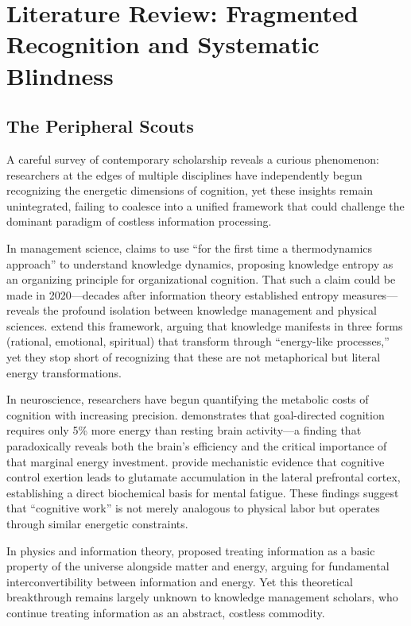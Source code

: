 \section{Literature Review: Fragmented Recognition and Systematic Blindness}

\subsection{The Peripheral Scouts}

A careful survey of contemporary scholarship reveals a curious phenomenon: researchers at the edges of multiple disciplines have independently begun recognizing the energetic dimensions of cognition, yet these insights remain unintegrated, failing to coalesce into a unified framework that could challenge the dominant paradigm of costless information processing.

In management science, \citet{bratianu2020} claims to use ``for the first time a thermodynamics approach'' to understand knowledge dynamics, proposing knowledge entropy as an organizing principle for organizational cognition. That such a claim could be made in 2020---decades after information theory established entropy measures---reveals the profound isolation between knowledge management and physical sciences. \citet{bratianu2020b} extend this framework, arguing that knowledge manifests in three forms (rational, emotional, spiritual) that transform through ``energy-like processes,'' yet they stop short of recognizing that these are not metaphorical but literal energy transformations.

In neuroscience, researchers have begun quantifying the metabolic costs of cognition with increasing precision. \citet{jamadar2025} demonstrates that goal-directed cognition requires only 5\% more energy than resting brain activity---a finding that paradoxically reveals both the brain's efficiency and the critical importance of that marginal energy investment. \citet{wiehler2022} provide mechanistic evidence that cognitive control exertion leads to glutamate accumulation in the lateral prefrontal cortex, establishing a direct biochemical basis for mental fatigue. These findings suggest that ``cognitive work'' is not merely analogous to physical labor but operates through similar energetic constraints.

In physics and information theory, \citet{stonier1996} proposed treating information as a basic property of the universe alongside matter and energy, arguing for fundamental interconvertibility between information and energy. Yet this theoretical breakthrough remains largely unknown to knowledge management scholars, who continue treating information as an abstract, costless commodity.

